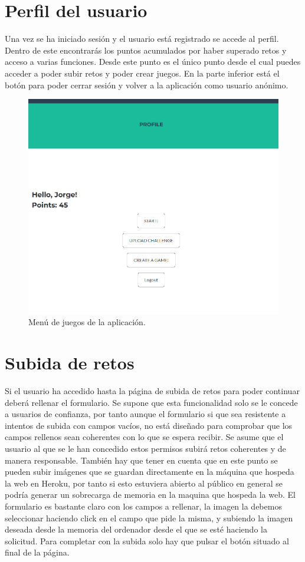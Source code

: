 \documentclass[a4paper, 12pt]{book}
\begin{document}
\section{Perfil del usuario}
Una vez se ha iniciado sesión y el usuario está registrado se accede al perfil. Dentro de este encontrarás los puntos acumulados por haber superado retos y acceso a varias funciones. Desde este punto es el único punto desde el cual puedes acceder a poder subir retos y poder crear juegos. En la parte inferior está el botón para poder cerrar sesión y volver a la aplicación como usuario anónimo. 
\begin{figure}
	\centering
	\includegraphics[width=16cm, keepaspectratio]{img/profile_html.png}
	\caption{Menú de juegos de la aplicación.}\label{fig:profile}
\end{figure}

\section{Subida de retos}
Si el usuario ha accedido hasta la página de subida de retos para poder continuar deberá rellenar el formulario. Se supone que esta funcionalidad solo se le concede a usuarios de confianza, por tanto aunque el formulario si que sea resistente a intentos de subida con campos vacíos, no está diseñado para comprobar que los campos rellenos sean coherentes con lo que se espera recibir. Se asume que el usuario al que se le han concedido estos permisos subirá retos coherentes y de manera responsable. También hay que tener en cuenta que en este punto se pueden subir imágenes que se guardan directamente en la máquina que hospeda la web en Heroku, por tanto si esto estuviera abierto al público en general se podría generar un sobrecarga de memoria en la maquina que hospeda la web.
El formulario es bastante claro con los campos a rellenar, la imagen la debemos seleccionar haciendo click en el campo que pide la misma, y subiendo la imagen deseada desde la memoria del ordenador desde el que se esté haciendo la solicitud. 
Para completar con la subida solo hay que pulsar el botón situado al final de la página. 
\end{document}
